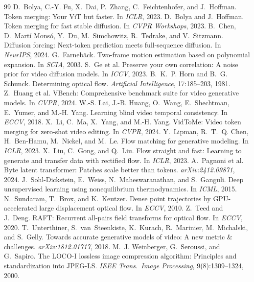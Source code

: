 \documentclass[10pt,twocolumn,letterpaper]{article}
\begin{document}
\small
\begin{thebibliography}{99}
 D.~Bolya, C.-Y. Fu, X.~Dai, P.~Zhang, C.~Feichtenhofer, and J.~Hoffman. Token merging: Your ViT but faster. In \emph{ICLR}, 2023.
 D.~Bolya and J.~Hoffman. Token merging for fast stable diffusion. In \emph{CVPR Workshops}, 2023.
 B.~Chen, D.~Mart\'i Mons\'o, Y.~Du, M.~Simchowitz, R.~Tedrake, and V.~Sitzmann. Diffusion forcing: Next-token prediction meets full-sequence diffusion. In \emph{NeurIPS}, 2024.
 G.~Farneb\"ack. Two-frame motion estimation based on polynomial expansion. In \emph{SCIA}, 2003.
 S.~Ge et al. Preserve your own correlation: A noise prior for video diffusion models. In \emph{ICCV}, 2023.
 B.~K.~P. Horn and B.~G. Schunck. Determining optical flow. \emph{Artificial Intelligence}, 17:185--203, 1981.
 Z.~Huang et al. VBench: Comprehensive benchmark suite for video generative models. In \emph{CVPR}, 2024.
 W.-S. Lai, J.-B. Huang, O.~Wang, E.~Shechtman, E.~Yumer, and M.-H. Yang. Learning blind video temporal consistency. In \emph{ECCV}, 2018.
 X.~Li, C.~Ma, X.~Yang, and M.-H. Yang. VidToMe: Video token merging for zero-shot video editing. In \emph{CVPR}, 2024.
 Y.~Lipman, R.~T.~Q. Chen, H.~Ben-Hamu, M.~Nickel, and M.~Le. Flow matching for generative modeling. In \emph{ICLR}, 2023.
 X.~Liu, C.~Gong, and Q.~Liu. Flow straight and fast: Learning to generate and transfer data with rectified flow. In \emph{ICLR}, 2023.
 A.~Pagnoni et al. Byte latent transformer: Patches scale better than tokens. \emph{arXiv:2412.09871}, 2024.
 J.~Sohl-Dickstein, E.~Weiss, N.~Maheswaranathan, and S.~Ganguli. Deep unsupervised learning using nonequilibrium thermodynamics. In \emph{ICML}, 2015.
 N.~Sundaram, T.~Brox, and K.~Keutzer. Dense point trajectories by GPU-accelerated large displacement optical flow. In \emph{ECCV}, 2010.
 Z.~Teed and J.~Deng. RAFT: Recurrent all-pairs field transforms for optical flow. In \emph{ECCV}, 2020.
 T.~Unterthiner, S.~van~Steenkiste, K.~Kurach, R.~Marinier, M.~Michalski, and S.~Gelly. Towards accurate generative models of video: A new metric \& challenges. \emph{arXiv:1812.01717}, 2018.
 M.~J. Weinberger, G.~Seroussi, and G.~Sapiro. The LOCO-I lossless image compression algorithm: Principles and standardization into JPEG-LS. \emph{IEEE Trans.\ Image Processing}, 9(8):1309--1324, 2000.
\end{thebibliography}
\end{document}
